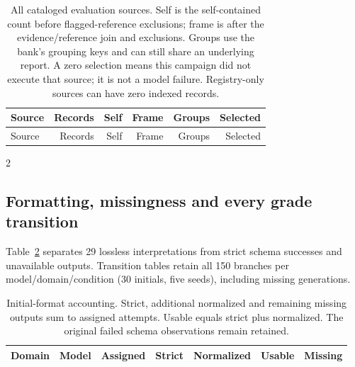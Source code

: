 \begingroup\small\setlength{\tabcolsep}{4pt}
\begin{longtable}{>{\raggedright\arraybackslash}p{.39\linewidth}rrrrr}
\caption{All cataloged evaluation sources. Self is the self-contained count
before flagged-reference exclusions; frame is after the evidence/reference
join and exclusions. Groups use the bank's grouping keys and can still share
an underlying report. A zero selection means this campaign did not execute
that source; it is not a model failure. Registry-only sources can have zero
indexed records.}
\label{tab:diagnostic-benchmarks}\\
\toprule Source & Records & Self & Frame & Groups & Selected\\\midrule\endfirsthead
\toprule Source & Records & Self & Frame & Groups & Selected\\\midrule\endhead

\bottomrule
\end{longtable}
\endgroup

\begin{multicols}{2}
\subsection{Formatting, missingness and every grade transition}
\label{app:diagnostic-transitions}
Table~\ref{tab:diagnostic-format} separates 29 lossless interpretations from
strict schema successes and unavailable outputs. Transition tables retain
all 150 branches per model/domain/condition (30 initials, five seeds),
including missing generations.
\end{multicols}

\begin{table}[H]
\centering\small\begin{tabular}{llrrrrr}
\toprule Domain & Model & Assigned & Strict & Normalized & Usable & Missing\\\midrule

\bottomrule\end{tabular}
\caption{Initial-format accounting. Strict, additional normalized and
remaining missing outputs sum to assigned attempts. Usable equals strict
plus normalized. The original failed schema observations remain retained.}
\label{tab:diagnostic-format}
\end{table}

